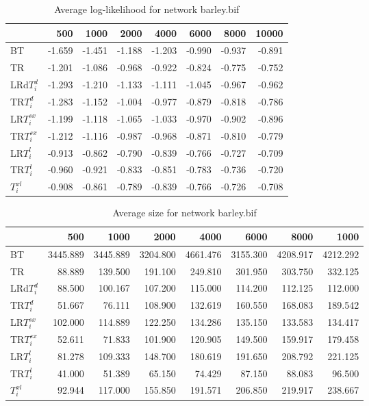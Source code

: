 \begin{table}
 \begin{center}
 \begin{tabular}{lrrrrrrr}
& 500 &  1000 & 2000 & 4000 & 6000& 8000&  10000\\\hline
BT & -1.659 & -1.451 & -1.188 & -1.203 & -0.990 & -0.937 & -0.891\\\hline
TR & -1.201 & -1.086 & -0.968 & -0.922 & -0.824 & -0.775 & -0.752\\\hline
LRd$T_i^d$ & -1.293 & -1.210 & -1.133 & -1.111 & -1.045 & -0.967 & -0.962\\\hline
TR$T_i^d$ & -1.283 & -1.152 & -1.004 & -0.977 & -0.879 & -0.818 & -0.786\\\hline
LR$T_i^{sx}$ & -1.199 & -1.118 & -1.065 & -1.033 & -0.970 & -0.902 & -0.896\\\hline
TR$T_i^{sx}$ & -1.212 & -1.116 & -0.987 & -0.968 & -0.871 & -0.810 & -0.779\\\hline
LR$T_i^l$ & -0.913 & -0.862 & -0.790 & -0.839 & -0.766 & -0.727 & -0.709\\\hline
TR$T_i^l$ & -0.960 & -0.921 & -0.833 & -0.851 & -0.783 & -0.736 & -0.720\\\hline
$T_i^{xl}$ & -0.908 & -0.861 & -0.789 & -0.839 & -0.766 & -0.726 & -0.708\\\hline
\end{tabular}
\end{center}
\caption{Average log-likelihood for network barley.bif }
\label{barley.bifll}\end{table}


\begin{table}
\begin{center}
\begin{tabular}{lrrrrrrr}
 & 500 &  1000 & 2000 & 4000 & 6000& 8000&  1000\\\hline
BT & 3445.889 & 3445.889 & 3204.800 & 4661.476 & 3155.300 & 4208.917 & 4212.292\\\hline
TR & 88.889 & 139.500 & 191.100 & 249.810 & 301.950 & 303.750 & 332.125\\\hline
LRd$T_i^d$ & 88.500 & 100.167 & 107.200 & 115.000 & 114.200 & 112.125 & 112.000\\\hline
TR$T_i^d$ & 51.667 & 76.111 & 108.900 & 132.619 & 160.550 & 168.083 & 189.542\\\hline
LR$T_i^{sx}$ & 102.000 & 114.889 & 122.250 & 134.286 & 135.150 & 133.583 & 134.417\\\hline
TR$T_i^{sx}$ & 52.611 & 71.833 & 101.900 & 120.905 & 149.500 & 159.917 & 179.458\\\hline
LR$T_i^l$ & 81.278 & 109.333 & 148.700 & 180.619 & 191.650 & 208.792 & 221.125\\\hline
TR$T_i^l$ & 41.000 & 51.389 & 65.150 & 74.429 & 87.150 & 88.083 & 96.500\\\hline
$T_i^{xl}$ & 92.944 & 117.000 & 155.850 & 191.571 & 206.850 & 219.917 & 238.667\\\hline
\end{tabular}
\end{center}
\caption{Average size for network barley.bif }
\label{barley.bifsi}\end{table}
